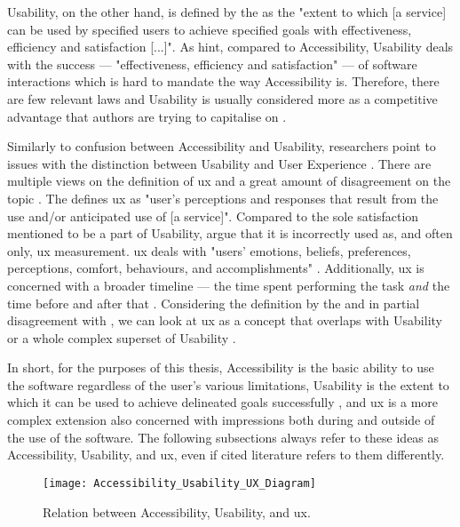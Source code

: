 Usability, on the other hand, is defined by the \textcite{ISO_9241-11:2018} as the "extent to which [a service] can be used by specified users to achieve specified goals with effectiveness, efficiency and satisfaction [...]".
As \textcite{Wegge_Zimmermann_2007} hint, compared to Accessibility, Usability deals with the success --- "effectiveness, efficiency and satisfaction" \parencite{ISO_9241-11:2018} --- of software interactions which is hard to mandate the way Accessibility is.
Therefore, there are few relevant laws and Usability is usually considered more as a competitive advantage that authors are trying to capitalise on \parencite{Wegge_Zimmermann_2007}.

Similarly to confusion between Accessibility and Usability, researchers point to issues with the distinction between Usability and User Experience \parencite{Darin_et_all_2019, Juergen_et_all_2020}.
There are multiple views on the definition of \gls{ux} and a great amount of disagreement on the topic \parencite{Juergen_et_all_2020}.
The \textcite{ISO_9241-11:2018} defines \gls{ux} as "user’s perceptions and responses that result from the use and/or anticipated use of [a service]".
Compared to the sole satisfaction mentioned to be a part of Usability, \textcite{Darin_et_all_2019} argue that it is incorrectly used as, and often only, \gls{ux} measurement. \gls{ux} deals with "users’ emotions, beliefs, preferences, perceptions, comfort, behaviours, and accomplishments" \parencite{ISO_9241-11:2018}.
Additionally, \gls{ux} is concerned with a broader timeline --- the time spent performing the task \emph{and} the time before and after that \parencite{Juergen_et_all_2020,ISO_9241-11:2018}.
Considering the definition by the \textcite{ISO_9241-11:2018} and in partial disagreement with \textcite{Darin_et_all_2019}, we can look at \gls{ux} as a concept that overlaps with Usability or a whole complex superset of Usability \parencite{Juergen_et_all_2020}.

In short, for the purposes of this thesis, Accessibility is the basic ability to use the software regardless of the user's various limitations, Usability is the extent to which it can be used to achieve delineated goals successfully \parencite{ISO_9241-11:2018}, and \gls{ux} is a more complex extension also concerned with impressions both during and outside of the use of the software.
The following subsections always refer to these ideas as Accessibility, Usability, and \gls{ux}, even if cited literature refers to them differently.

\begin{figure}[H]
    \centering
    \texttt{[image: Accessibility\_Usability\_UX\_Diagram]}
    \caption{Relation between Accessibility, Usability, and \gls{ux}.}
    \label{fig:hsie-relations}
\end{figure}

